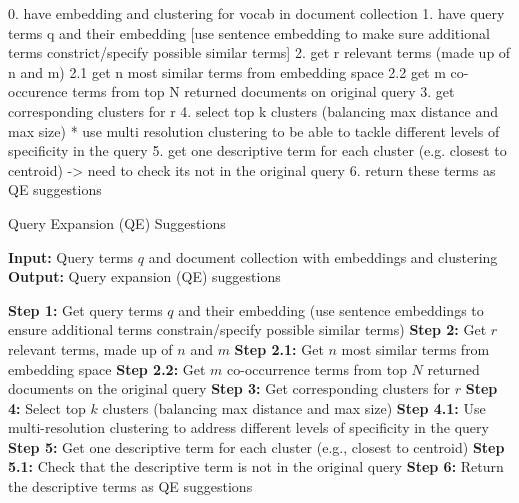 0. have embedding and clustering for vocab in document collection
1. have query terms q and their embedding [use sentence embedding to make sure additional terms constrict/specify possible similar terms]
2. get r relevant terms (made up of n and m)
2.1 get n most similar terms from embedding space
2.2 get m co-occurence terms from top N returned documents on original query
3. get corresponding clusters for r
4. select top k clusters ({balancing max distance and max size}) * use multi resolution clustering to be able to tackle different levels of specificity in the query
5. get one descriptive term for each cluster (e.g. closest to centroid)
    -> need to check its not in the original query
6. return these terms as QE suggestions



\begin{algorithm}
    \caption{Query Expansion (QE) Suggestions}
    \begin{algorithmic}[1]
        \State \textbf{Input:} Query terms $q$ and document collection with embeddings and clustering
        \State \textbf{Output:} Query expansion (QE) suggestions
        \State
        
        \State \textbf{Step 1:} Get query terms $q$ and their embedding (use sentence embeddings to ensure additional terms constrain/specify possible similar terms)
        \State \textbf{Step 2:} Get $r$ relevant terms, made up of $n$ and $m$
        \State \quad \textbf{Step 2.1:} Get $n$ most similar terms from embedding space
        \State \quad \textbf{Step 2.2:} Get $m$ co-occurrence terms from top $N$ returned documents on the original query
        \State \textbf{Step 3:} Get corresponding clusters for $r$
        \State \textbf{Step 4:} Select top $k$ clusters (balancing max distance and max size)
        \State \quad \textbf{Step 4.1:} Use multi-resolution clustering to address different levels of specificity in the query
        \State \textbf{Step 5:} Get one descriptive term for each cluster (e.g., closest to centroid)
        \State \quad \textbf{Step 5.1:} Check that the descriptive term is not in the original query
        \State \textbf{Step 6:} Return the descriptive terms as QE suggestions
    \end{algorithmic}
\end{algorithm}


